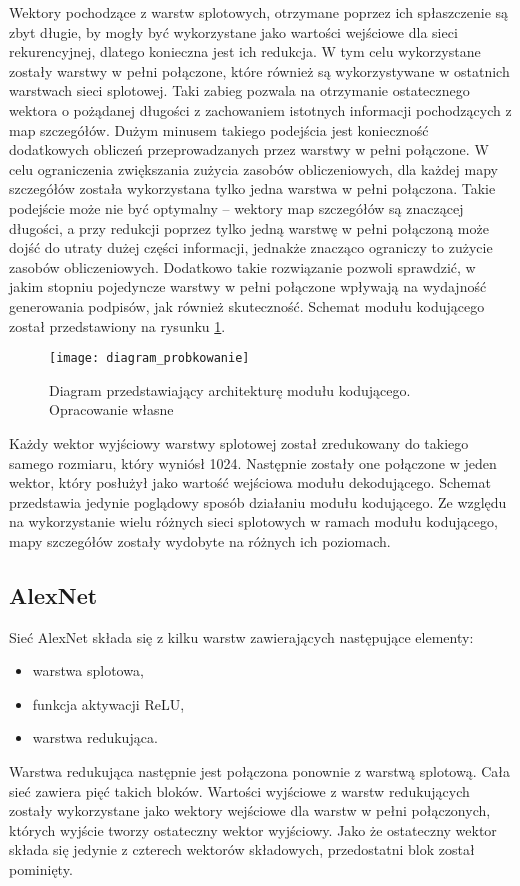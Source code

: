 Wektory pochodzące z warstw splotowych, otrzymane poprzez ich spłaszczenie są zbyt długie, by mogły być wykorzystane jako wartości wejściowe dla sieci rekurencyjnej, dlatego konieczna jest ich redukcja. W tym celu wykorzystane zostały warstwy w pełni połączone, które również są wykorzystywane w ostatnich warstwach sieci splotowej. Taki zabieg pozwala na otrzymanie ostatecznego wektora o pożądanej długości z zachowaniem istotnych informacji pochodzących z map szczegółów. Dużym minusem takiego podejścia jest konieczność dodatkowych obliczeń przeprowadzanych przez warstwy w pełni połączone. W celu ograniczenia zwiększania zużycia zasobów obliczeniowych, dla każdej mapy szczegółów została wykorzystana tylko jedna warstwa w pełni połączona. Takie podejście może nie być optymalny -- wektory map szczegółów są znaczącej długości, a przy redukcji poprzez tylko jedną warstwę w pełni połączoną może dojść do utraty dużej części informacji, jednakże znacząco ograniczy to zużycie zasobów obliczeniowych. Dodatkowo takie rozwiązanie pozwoli sprawdzić, w jakim stopniu pojedyncze warstwy w pełni połączone wpływają na wydajność generowania podpisów, jak również skuteczność. Schemat modułu kodującego został przedstawiony na rysunku \ref{fig:schemat-probkowanie}.
\begin{figure}[H]
    \centering
    \texttt{[image: diagram\_probkowanie]}
    \caption{Diagram przedstawiający architekturę modułu kodującego. Opracowanie własne}
    \label{fig:schemat-probkowanie}
\end{figure}
\noindent Każdy wektor wyjściowy warstwy splotowej został zredukowany do takiego samego rozmiaru, który wyniósł 1024. Następnie zostały one połączone w jeden wektor, który posłużył jako wartość wejściowa modułu dekodującego. Schemat przedstawia jedynie poglądowy sposób działaniu modułu kodującego. Ze względu na wykorzystanie wielu różnych sieci splotowych w ramach modułu kodującego, mapy szczegółów zostały wydobyte na różnych ich poziomach.
\subsection{AlexNet}
Sieć AlexNet \cite{alexnet} składa się z kilku warstw zawierających następujące elementy:
\begin{itemize}
    \item warstwa splotowa,
    \item funkcja aktywacji ReLU,
    \item warstwa redukująca.
\end{itemize}
Warstwa redukująca następnie jest połączona ponownie z warstwą splotową. Cała sieć zawiera pięć takich bloków. Wartości wyjściowe z warstw redukujących zostały wykorzystane jako wektory wejściowe dla warstw w pełni połączonych, których wyjście tworzy ostateczny wektor wyjściowy. Jako że ostateczny wektor składa się jedynie z czterech wektorów składowych, przedostatni blok został pominięty.
